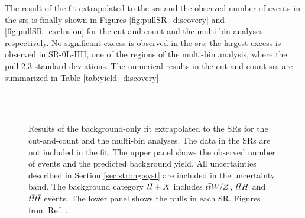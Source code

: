 The result of the fit extrapolated to the \glspl{sr} and the observed number of events in the \glspl{sr} is finally
shown in Figures \ref{fig:pullSR_discovery} and \ref{fig:pullSR_exclusion} 
for the cut-and-count and the multi-bin analyses respectively. 
No significant excess is observed in the \glspl{sr}; the largest excess is observed in SR-0L-HH, 
one of the regions of the multi-bin analysis, where the pull 2.3 standard deviations. 
The numerical results in the cut-and-count \glspl{sr} are summarized in Table \ref{tab:yield_discovery}.

\begin{figure}[htbp]
	\centering
	\\
	\\
	\caption{Results of the background-only fit extrapolated to the SRs for 
	the cut-and-count and  the multi-bin analyses. The data in the  SRs are 
	not included in the fit.  The upper panel shows the observed number of events and the predicted background 
	yield. All uncertainties  described in Section \ref{sec:strong:syst} are included in the uncertainty band. The background 
	category $t\overline{t}+X$ includes $t\overline{t} W/Z$, $t\overline{t} H$ and $t\overline{t} t\overline{t}$ events. The lower panel shows the 
	pulls in each SR.  Figures from Ref. \cite{Aaboud:2017hrg}.} 
	\label{fig:pullSR}
\end{figure}

